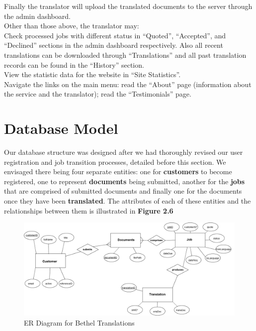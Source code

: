 \documentclass{l3proj}
\begin{document}
Finally the translator will upload the translated documents to the server
through the admin dashboard.\\

Other than those above, the translator may: \\

Check processed jobs with different status in “Quoted”, “Accepted”, and
“Declined” sections in the admin dashboard respectively. Also all recent
translations can be downloaded through “Translations” and all past translation
records can be found in the “History” section.\\

View the statistic data for the website in “Site Statistics”.\\

	Navigate the links on the main menu: read the “About” page (information
about the service and the translator); read the “Testimonials” page.\\


\newpage

\section{Database Model}

Our database structure was designed after we had thoroughly revised our user
registration and job transition 
processes, detailed before this section. We envisaged there being four separate
entities: one for \textbf{customers} to become 
registered, one to represent \textbf{documents} being submitted, another for the
\textbf{jobs} that are comprised 
of submitted documents and finally one for the documents once they have been
\textbf{translated}. 
The attributes of each of these entities and the relationships between them is
illustrated in \textbf{Figure 2.6} 

\begin{figure}
\begin{center}
\includegraphics[scale=0.5,angle=90]{bt-erdiag}
\caption{ER Diagram for Bethel Translations}
\end{center}
\end{figure}
\end{document}
